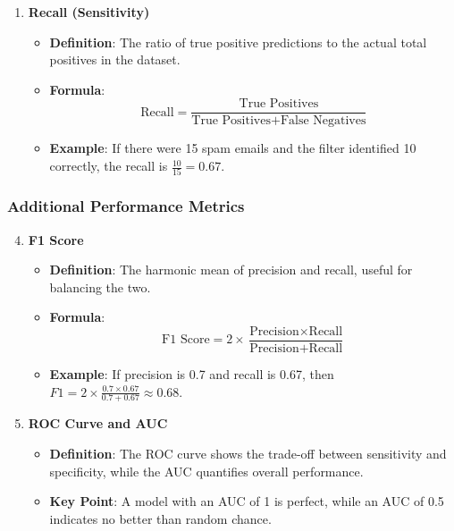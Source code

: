 \documentclass[aspectratio=169]{beamer}
\begin{document}
\begin{frame}[fragile]
\begin{enumerate}
        \item \textbf{Recall (Sensitivity)}
            \begin{itemize}
                \item \textbf{Definition}: The ratio of true positive predictions to the actual total positives in the dataset.
                \item \textbf{Formula}:
                \begin{equation}
                    \text{Recall} = \frac{\text{True Positives}}{\text{True Positives} + \text{False Negatives}}
                \end{equation}
                \item \textbf{Example}: If there were 15 spam emails and the filter identified 10 correctly, the recall is \( \frac{10}{15} = 0.67 \).
            \end{itemize}
    \end{enumerate}
\end{frame}

\begin{frame}[fragile]
    \frametitle{Additional Performance Metrics}
    \begin{enumerate}
        \setcounter{enumi}{3}
        \item \textbf{F1 Score}
            \begin{itemize}
                \item \textbf{Definition}: The harmonic mean of precision and recall, useful for balancing the two.
                \item \textbf{Formula}:
                \begin{equation}
                    \text{F1 Score} = 2 \times \frac{\text{Precision} \times \text{Recall}}{\text{Precision} + \text{Recall}}
                \end{equation}
                \item \textbf{Example}: If precision is 0.7 and recall is 0.67, then \( F1 = 2 \times \frac{0.7 \times 0.67}{0.7 + 0.67} \approx 0.68 \).
            \end{itemize}

        \item \textbf{ROC Curve and AUC}
            \begin{itemize}
                \item \textbf{Definition}: The ROC curve shows the trade-off between sensitivity and specificity, while the AUC quantifies overall performance.
                \item \textbf{Key Point}: A model with an AUC of 1 is perfect, while an AUC of 0.5 indicates no better than random chance.
            \end{itemize}
    \end{enumerate}
\end{frame}
\end{document}
